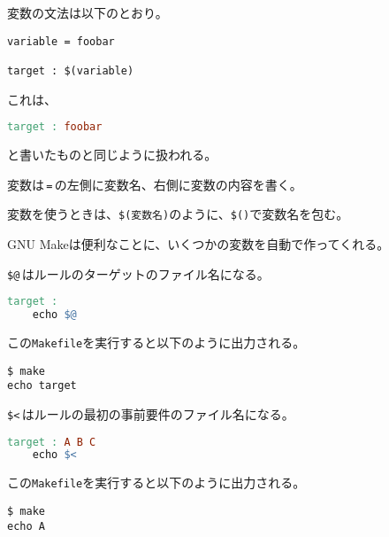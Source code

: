変数の文法は以下のとおり。

\begin{lstlisting}[style=grammar]
variable = foobar

target : $(variable)
\end{lstlisting}

これは、
\begin{lstlisting}[language=make]
target : foobar
\end{lstlisting}
と書いたものと同じように扱われる。

変数は\,\texttt{=}\,の左側に変数名、右側に変数の内容を書く。

変数を使うときは、\texttt{\$(変数名)}のように、\texttt{\$()}で変数名を包む。


GNU Makeは便利なことに、いくつかの変数を自動で作ってくれる。


\texttt{\$@}\,はルールのターゲットのファイル名になる。

\begin{lstlisting}[language=make]
target :
    echo $@
\end{lstlisting}

この\texttt{Makefile}を実行すると以下のように出力される。

\begin{lstlisting}[style=terminal]
$ make
echo target
\end{lstlisting}


\texttt{\$<}\,はルールの最初の事前要件のファイル名になる。

\begin{lstlisting}[language=make]
target : A B C
    echo $<
\end{lstlisting}

この\texttt{Makefile}を実行すると以下のように出力される。

\begin{lstlisting}[style=terminal]
$ make
echo A
\end{lstlisting}

